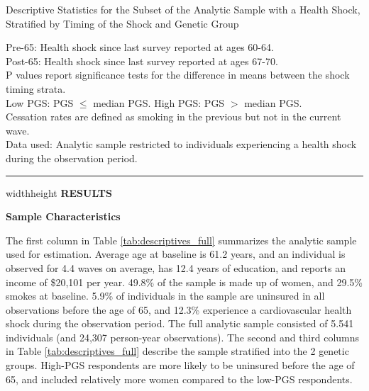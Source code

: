 \documentclass[12pt]{article}
\newlength{\seplinewidth}
\newlength{\seplinesep}
\newcommand*{\sepline}{%
	\par
	\vspace{\dimexpr\seplinesep+.5\parskip}%
	\cleaders\vbox{%
		\begingroup %
		\color{sepline}%
		\hrule width\linewidth height\seplinewidth
		\endgroup
	}\vskip\seplinewidth
	\vspace{\dimexpr\seplinesep-.5\parskip}%
}
\begin{document}
\captionsetup{width = 16.2cm}
\begin{table*}[!h] \centering
	\caption{Descriptive Statistics for the Subset of the Analytic Sample with a Health Shock, Stratified by Timing of the Shock and Genetic Group}
	\label{tab:descriptive_subgroup}
	
	\begin{flushleft}
			\footnotesize
			Pre-65: Health shock since last survey reported at ages 60-64.\\
			Post-65: Health shock since last survey reported at ages 67-70.\\
			P values report significance tests for the difference in means between the shock timing strata.\\
			Low PGS: PGS $\leq$ median PGS. High PGS: PGS $>$ median PGS.\\
			Cessation rates are defined as smoking in the previous but not in the current wave.\\
			Data used: Analytic sample restricted to individuals experiencing a health shock during the observation period.
	\end{flushleft}
\end{table*}


\vspace{-0.9mm}
\color{sepline}%
\hrule width\linewidth height\seplinewidth
\vspace{2mm}
\normalsize
\vspace{1mm}
\color{Black}
\noindent \textbf{\large \textsf{RESULTS}}
\vspace{1mm}


\noindent \textbf{\textsf{\textcolor{NavyBlue}{Sample Characteristics}}}

\noindent The first column in Table \ref{tab:descriptives_full} summarizes the analytic sample used for estimation. Average age at baseline is 61.2 years, and an individual is observed for 4.4 waves on average, has 12.4 years of education, and reports an income of \$20,101 per year. 49.8\% of the sample is made up of women, and 29.5\% smokes at baseline. 5.9\% of individuals in the sample are uninsured in all observations before the age of 65, and 12.3\% experience a cardiovascular health shock during the observation period. The full analytic sample consisted of 5.541 individuals (and 24,307 person-year observations). The second and third columns in Table \ref{tab:descriptives_full} describe the sample stratified into the 2 genetic groups. High-PGS respondents are more likely to be uninsured before the age of 65, and included relatively more women compared to the low-PGS respondents.
\end{document}
